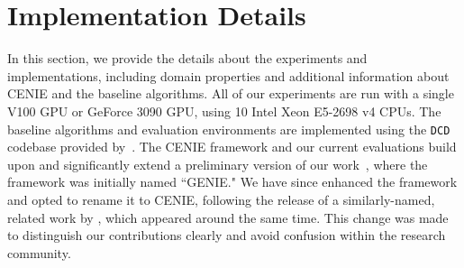 \section{Implementation Details} \label{section:implementation_details}
In this section, we provide the details about the experiments and implementations, including domain properties and additional information about CENIE and the baseline algorithms. All of our experiments are run with a single V100 GPU or GeForce 3090 GPU, using 10 Intel Xeon E5-2698 v4 CPUs. The baseline algorithms and evaluation environments are implemented using the \texttt{DCD} codebase provided by~\citet{jiang2021replay,parker2022evolving}. The CENIE framework and our current evaluations build upon and significantly extend a preliminary version of our work~\cite{jayden2024unifying}, where the framework was initially named ``GENIE." We have since enhanced the framework and opted to rename it to CENIE, following the release of a similarly-named, related work by \citet{bruce2024genie}, which appeared around the same time. This change was made to distinguish our contributions clearly and avoid confusion within the research community.


